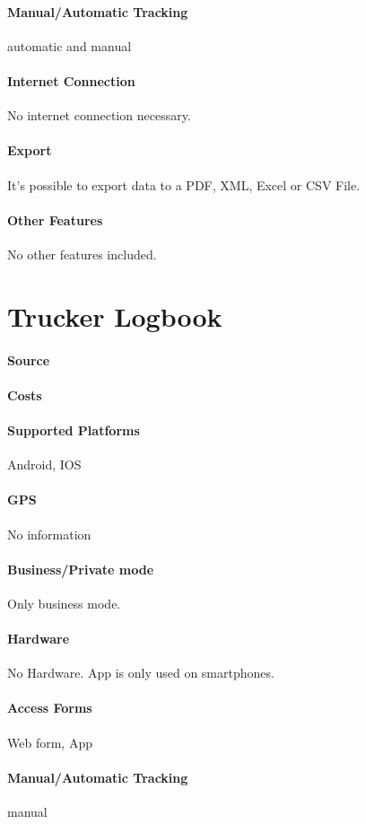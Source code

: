 \paragraph{Manual/Automatic Tracking} automatic and manual
\paragraph{Internet Connection} No internet connection necessary.
\paragraph{Export} It’s possible to export data to a PDF, XML, Excel or CSV File.
\paragraph{Other Features} No other features included.
\newpage
\section{Trucker Logbook}
\paragraph{Source} 
\paragraph{Costs} 
\paragraph{Supported Platforms} Android, IOS
\paragraph{GPS} No information
\paragraph{Business/Private mode} Only business mode.
\paragraph{Hardware} No Hardware. App is only used on smartphones.
\paragraph{Access Forms}Web form, App
\paragraph{Manual/Automatic Tracking} manual
